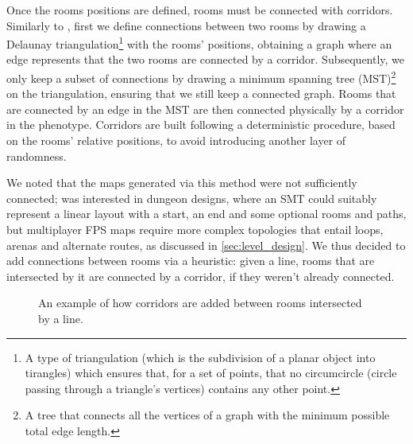 \documentclass{Configuration_Files/PoliMi3i_thesis}
\begin{document}
Once the rooms positions are defined, rooms must be connected with corridors. Similarly to \citeauthor{whitehead_spatial_2020}, first we define connections between two rooms by drawing a Delaunay triangulation\footnote{A type of triangulation (which is the subdivision of a planar object into tirangles) which ensures that, for a set of points, that no circumcircle (circle passing through a triangle's vertices) contains any other point.} with the rooms' positions, obtaining a graph where an edge represents that the two rooms are connected by a corridor. Subsequently, we only keep a subset of connections by drawing a minimum spanning tree (MST)\footnote{A tree that connects all the vertices of a graph with the minimum possible total edge length.} on the triangulation, ensuring that we still keep a connected graph. Rooms that are connected by an edge in the MST are then connected physically by a corridor in the phenotype. Corridors are built following a deterministic procedure, based on the rooms' relative positions, to avoid introducing another layer of randomness. 

We noted that the maps generated via this method were not sufficiently connected; \citeauthor{whitehead_spatial_2020} was interested in dungeon designs, where an SMT could suitably represent a linear layout with a start, an end and some optional rooms and paths, but multiplayer FPS maps require more complex topologies that entail loops, arenas and alternate routes, as discussed in \ref{sec:level_design}. We thus decided to add connections between rooms via a heuristic: given a line, rooms that are intersected by it are connected by a corridor, if they weren't already connected.

\begin{figure}[H]
    \centering
    \caption[SMT-Genome lines]{An example of how corridors are added between rooms intersected by a line.}
    \label{fig:smt_genome}
\end{figure}
\end{document}
